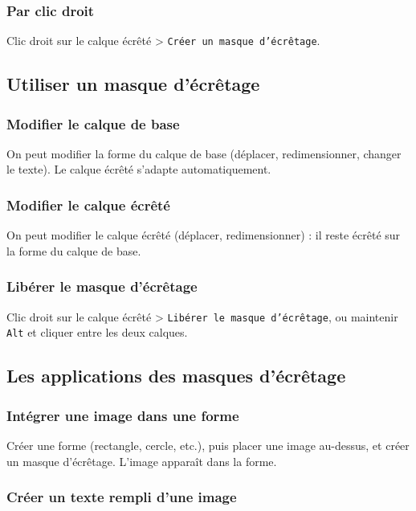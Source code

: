 \subsubsection{Par clic droit}

Clic droit sur le calque écrêté > \texttt{Créer un masque d'écrêtage}.

\subsection{Utiliser un masque d'écrêtage}

\subsubsection{Modifier le calque de base}

On peut modifier la forme du calque de base (déplacer, redimensionner, changer le texte). Le calque écrêté s'adapte automatiquement.

\subsubsection{Modifier le calque écrêté}

On peut modifier le calque écrêté (déplacer, redimensionner) : il reste écrêté sur la forme du calque de base.

\subsubsection{Libérer le masque d'écrêtage}

Clic droit sur le calque écrêté > \texttt{Libérer le masque d'écrêtage}, ou maintenir \texttt{Alt} et cliquer entre les deux calques.

\subsection{Les applications des masques d'écrêtage}

\subsubsection{Intégrer une image dans une forme}

Créer une forme (rectangle, cercle, etc.), puis placer une image au-dessus, et créer un masque d'écrêtage. L'image apparaît dans la forme.

\subsubsection{Créer un texte rempli d'une image}

